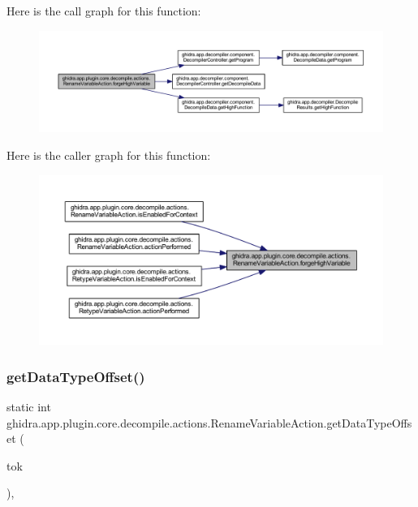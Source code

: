 Here is the call graph for this function\+:
\nopagebreak
\begin{figure}[H]
\begin{center}
\leavevmode
\includegraphics[width=350pt]{classghidra_1_1app_1_1plugin_1_1core_1_1decompile_1_1actions_1_1_rename_variable_action_a417ef24d8f7262d693795f45d87ddcf1_cgraph}
\end{center}
\end{figure}
Here is the caller graph for this function\+:
\nopagebreak
\begin{figure}[H]
\begin{center}
\leavevmode
\includegraphics[width=350pt]{classghidra_1_1app_1_1plugin_1_1core_1_1decompile_1_1actions_1_1_rename_variable_action_a417ef24d8f7262d693795f45d87ddcf1_icgraph}
\end{center}
\end{figure}
\mbox{\label{classghidra_1_1app_1_1plugin_1_1core_1_1decompile_1_1actions_1_1_rename_variable_action_ac5eedef3e8e52cd9cfa2650f76341f55}} 
\subsubsection{\texorpdfstring{getDataTypeOffset()}{getDataTypeOffset()}}
{\footnotesize\ttfamily static int ghidra.\+app.\+plugin.\+core.\+decompile.\+actions.\+Rename\+Variable\+Action.\+get\+Data\+Type\+Offset (\begin{DoxyParamCaption}\item[{\mbox{\hyperlink{classghidra_1_1app_1_1decompiler_1_1_clang_token}{Clang\+Token}}}]{tok }\end{DoxyParamCaption})\hspace{0.3cm}{\ttfamily [inline]}, {\ttfamily [static]}}

